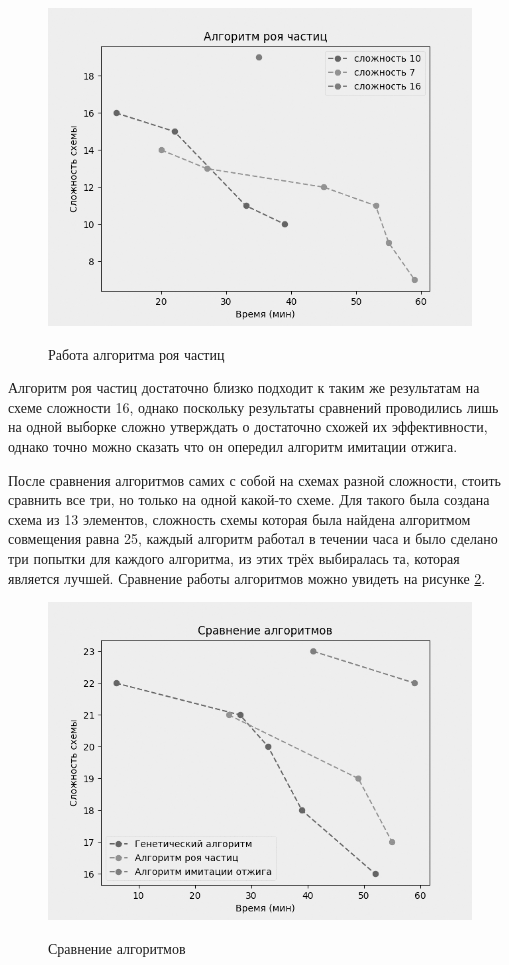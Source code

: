 \documentclass[14pt]{extarticle} %
\begin{document}
\begin{figure}[h]
	\centering
	\caption{Работа алгоритма роя частиц}
	\includegraphics[scale=0.75]{img/figure_3.png}
	\label{swarm}
\end{figure}

Алгоритм роя частиц достаточно близко подходит к таким же результатам на схеме сложности 16, однако поскольку результаты сравнений проводились лишь на одной выборке сложно утверждать о достаточно схожей их эффективности, однако точно можно сказать что он опередил алгоритм имитации отжига.



После сравнения алгоритмов самих с собой на схемах разной сложности, стоить сравнить все три, но только на одной какой-то схеме. Для такого была создана схема из 13 элементов, сложность схемы которая была найдена алгоритмом совмещения равна 25, каждый алгоритм работал в течении часа и было сделано три попытки для каждого алгоритма, из этих трёх выбиралась та, которая является лучшей. Сравнение работы алгоритмов можно увидеть на рисунке \ref{compare}.


\begin{figure}[h]
	\centering
	\caption{Сравнение алгоритмов}
	\includegraphics[scale=0.8]{img/figure_4.png}
	\label{compare}
\end{figure}
\end{document}
